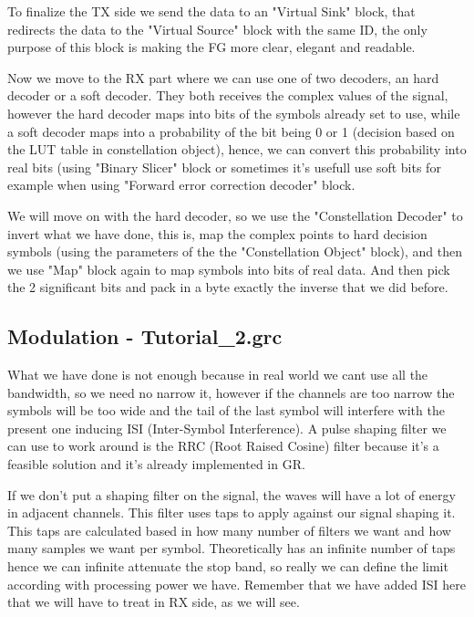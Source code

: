 \documentclass[a4paper, 10pt, conference]{ieeeconf}      %
\begin{document}
        To finalize the TX side we send the data to an "Virtual Sink" block, that redirects the data to the "Virtual Source" block with the same ID, the only purpose of this block is making the FG more clear, elegant and readable.
        
        Now we move to the RX part where we can use one of two decoders, an hard decoder or a soft decoder. They both receives the complex values of the signal, however the hard decoder maps into bits of the symbols already set to use, while a soft decoder maps into a probability of the bit being 0 or 1  (decision based on the LUT table in constellation object), hence, we can convert this probability into real bits (using "Binary Slicer" block or sometimes it's usefull use soft bits for example when using "Forward error correction decoder" block. 
        
        We will move on with the hard decoder, so we use the "Constellation Decoder" to invert what we have done, this is, map the complex points to hard decision symbols (using the parameters of the the "Constellation Object" block), and then we use "Map" block again to map symbols into bits of real data. And then pick the 2 significant bits and pack in a byte exactly the inverse that we did before.
        
        
\subsection{Modulation - Tutorial\_2.grc}
    What we have done is not enough because in real world we cant use all the bandwidth, so we need no narrow it, however if the channels are too narrow the symbols will be too wide and the tail of the last symbol will interfere with the present one inducing ISI (Inter-Symbol Interference). A pulse shaping filter we can use to work around is the RRC (Root Raised Cosine) filter because it's a feasible solution and it's already implemented in GR.      
    
   If we don't put a shaping filter on the signal, the waves will have a lot of energy in adjacent channels. This filter uses taps to apply against our signal shaping it. This taps are calculated based in how many number of filters we want and how many samples we want per symbol. Theoretically has an infinite number of taps hence we can infinite attenuate the stop band, so really we can define the limit according with processing power we have. Remember that we have added ISI here that we will have to treat in RX side, as we will see.
   
\end{document}
